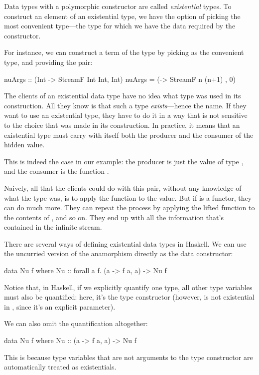 \documentclass[DaoFP]{subfiles}
\begin{document}
Data types with a polymorphic constructor are called \emph{existential} types. To construct an element of an existential type, we have the option of picking the most convenient type---the type for which we have the data required by the constructor. 

For instance, we can construct a term of the type  by picking  as the convenient type, and providing the pair:
\begin{haskell}
nuArgs :: (Int -> StreamF Int Int, Int)
nuArgs =  (\n -> StreamF n (n+1) , 0)
\end{haskell}

The clients of an existential data type have no idea what type was used in its construction. All they know is that such a type \emph{exists}---hence the name. If they want to use an existential type, they have to do it in a way that is not sensitive to the choice that was made in its construction. In practice, it means that an existential type must carry with itself both the producer and the consumer of the hidden value. 

This is indeed the case in our example: the producer is just the value of type , and the consumer is the function .

Naively, all that the clients could do with this pair, without any knowledge of what the type  was, is to apply the function to the value. But if  is a functor, they can do much more. They can repeat the process by applying the lifted function to the contents of , and so on. They end up with all the information that's contained in the infinite stream.

There are several ways of defining existential data types in Haskell. We can use the uncurried version of the anamorphism directly as the data constructor:
\begin{haskell}
data Nu f where 
  Nu :: forall a f. (a -> f a, a) -> Nu f
\end{haskell}
Notice that, in Haskell, if we explicitly quantify one type, all other type variables must also be quantified: here, it's the type constructor  (however,  is not existential in , since it's an explicit parameter). 

We can also omit the quantification altogether:
\begin{haskell}
data Nu f where 
  Nu :: (a -> f a, a) -> Nu f
\end{haskell}
This is because type variables that are not arguments to the type constructor are automatically treated as existentials. 
\end{document}
